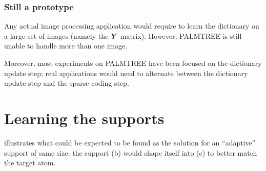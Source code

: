 \subsubsection{Still a prototype}
Any actual image processing application would require to learn the dictionary on a large set of images (namely the $\bm{Y}$ matrix). However, \ac{PALMTREE} is still unable to handle more than one image.

Moreover, most experiments on \ac{PALMTREE} have been focused on the dictionary update step; real applications would need to alternate between the dictionary update step and the sparse coding step.

\section{Learning the supports}

 illustrates what could be expected to be found as the solution for an “adaptive” support of same size: the support (b) would shape itself into (c) to better match the target atom.

